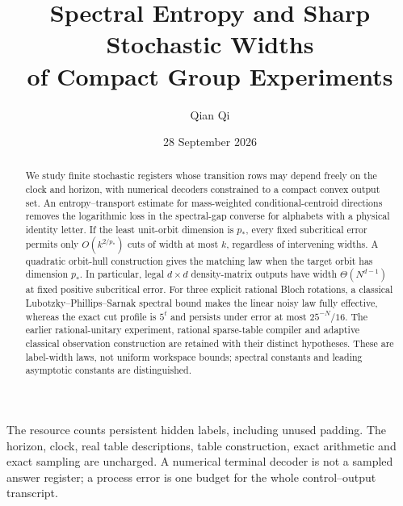 \documentclass[11pt]{amsart}
\title[Sharp stochastic widths]{Spectral Entropy and Sharp Stochastic Widths\\of Compact Group Experiments}
\author{Qian Qi}
\date{28 September 2026}
\numberwithin{equation}{section}
\theoremstyle{definition}\newtheorem{definition}[theorem]{Definition}
\theoremstyle{remark}\newtheorem{remark}[theorem]{Remark}
\begin{document}
\begin{abstract}
We study finite stochastic registers whose transition rows may depend
freely on the clock and horizon, with numerical decoders constrained to
a compact convex output set. An entropy--transport estimate for
mass-weighted conditional-centroid directions removes the logarithmic
loss in the spectral-gap converse for alphabets with a physical identity
letter. If the least unit-orbit dimension is
$p_*$, every fixed subcritical error permits only $O(k^{2/p_*})$ cuts
of width at most $k$, regardless of intervening widths. A quadratic
orbit-hull construction gives the matching law when the target orbit
has dimension $p_*$. In particular, legal $d\times d$ density-matrix
outputs have width $\Theta(N^{d-1})$ at fixed positive subcritical
error. For three explicit rational Bloch rotations, a classical
Lubotzky--Phillips--Sarnak spectral bound makes the linear noisy law
fully effective, whereas the exact cut profile is $5^t$ and persists
under error at most $25^{-N}/16$. The earlier rational-unitary
experiment, rational sparse-table compiler and adaptive classical
observation construction are retained with their distinct hypotheses.
These are label-width laws, not uniform workspace bounds; spectral
constants and leading asymptotic constants are distinguished.
\end{abstract}
\maketitle
\noindent The resource counts persistent hidden labels, including unused
padding. The horizon, clock, real table descriptions, table construction,
exact arithmetic and exact sampling are uncharged. A numerical terminal
decoder is not a sampled answer register; a process error is one budget
for the whole control--output transcript.
















\end{document}
